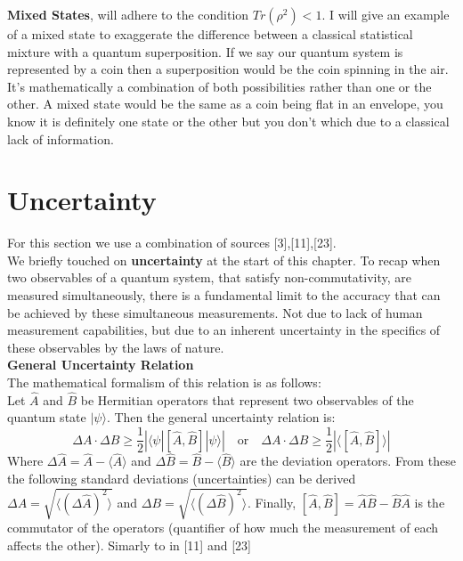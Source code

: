 \noindent\textbf{Mixed States}, will adhere to the condition \(Tr(\rho^2) < 1\). I will give an example of a mixed state to exaggerate the difference between a classical statistical mixture with a quantum superposition. If we say our quantum system is represented by a coin then a superposition would be the coin spinning in the air. It's mathematically a combination of both possibilities rather than one or the other. A mixed state would be the same as a coin being flat in an envelope, you know it is definitely one state or the other but you don't which due to a classical lack of information. 




\section{Uncertainty}
For this section we use a combination of sources [3],[11],[23].\\
We briefly touched on \textbf{uncertainty} at the start of this chapter. To recap when two observables of a quantum system, that satisfy non-commutativity, are measured simultaneously, there is a fundamental limit to the accuracy that can be achieved by these simultaneous measurements. Not due to lack of human measurement capabilities, but due to an inherent uncertainty in the specifics of these observables by the laws of nature.\\

\noindent\textbf{General Uncertainty Relation}\\
The mathematical formalism of this relation is as follows:\\
Let $\hat{A}$ and $\hat{B}$ be Hermitian operators that represent two observables of the quantum state $|\psi \rangle$. Then the general uncertainty relation is:
\begin{equation}
    \Delta A \cdot \Delta B \geq \frac{1}{2} \left| \langle \psi| [\hat{A}, \hat{B}] | \psi \rangle \right| \quad \text{or} \quad  \Delta A \cdot \Delta B \geq \frac{1}{2} \left| \langle [\hat{A}, \hat{B}] \rangle \right|
\end{equation}
Where \( \Delta \hat{A} = \hat{A} - \langle \hat{A} \rangle \) and \( \Delta \hat{B} = \hat{B} - \langle \hat{B} \rangle \) are the deviation operators. From these the following standard deviations (uncertainties) can be derived \( \Delta A = \sqrt{ \langle (\Delta \hat{A})^2 \rangle } \) and \( \Delta B = \sqrt{ \langle (\Delta \hat{B})^2 \rangle } \). Finally, \( [\hat{A}, \hat{B}] = \hat{A}\hat{B} - \hat{B}\hat{A} \) is the commutator of the operators (quantifier of how much the measurement of each affects the other). Simarly to in [11] and [23]\\

